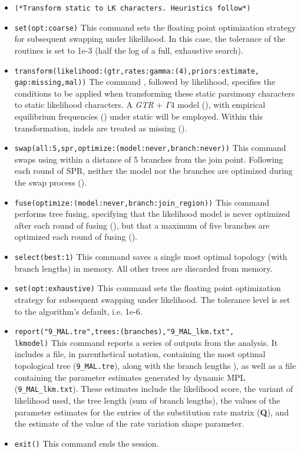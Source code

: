 \begin{itemize}
\item \texttt{(*Transform static to LK characters. Heuristics
follow*)} 
\item \texttt{set(opt:coarse)} This command sets the
floating point optimization strategy for subsequent swapping under
likelihood. In this case, the tolerance of the routines is set to
1e-3 (half the log of a full, exhaustive search).  
\item \texttt{transform(likelihood:(gtr,rates:gamma:(4),priors:estimate,\\gap:missing,mal))}
The command , followed by \poyargument
{likelihood}, specifies the conditions to be applied when transforming
these static parsimony characters to static likelihood characters.
A \emph{GTR} + $\Gamma 4$ model (),
with empirical equilibrium frequencies ()
under static  will be employed.  Within this
transformation, indels are treated as missing ().
\item \texttt{swap(all:5,spr,optimize:(model:never,branch:never))}
This command swaps using  within a distance of 5
branches from the join point. Following each round of SPR, neither
the model nor the branches are optimized during the swap process
().  
\item \texttt{fuse(optimize:(model:never,branch:join\_region))} This
command performs tree fusing, specifying that the likelihood model
is never optimized after each round of fusing
(), but that a maximum of five
branches are optimized each round of fusing
().  
\item \texttt{select(best:1)} This command saves a single most optimal
topology (with branch lengths) in memory. All other trees are
discarded from memory.  
\item \texttt{set(opt:exhaustive)} This command sets the floating 
point optimization strategy for subsequent swapping under likelihood. 
The tolerance level is set to the algorithm's default, i.e. 1e-6.  
\item \texttt{report("9\_MAL.tre",trees:(branches),"9\_MAL\_lkm.txt",\\
lkmodel)} This command reports a series of outputs from the analysis.
It includes a file, in parenthetical notation, containing the most
optimal topological tree (\texttt{9\_MAL.tre}), along with the
branch lengths ), as well as a file
containing the parameter estimates generated by dynamic MPL
(\texttt{9\_MAL\_lkm.txt}). These estimates include the likelihood
score, the variant of likelihood used, the tree length (sum of
branch lengths), the values of the parameter estimates for the
entries of the substitution rate matrix (\textbf{Q}), and the
estimate of the value of the rate variation shape parameter.  
\item \texttt{exit()} This command ends the \poy session.

\end{itemize}

